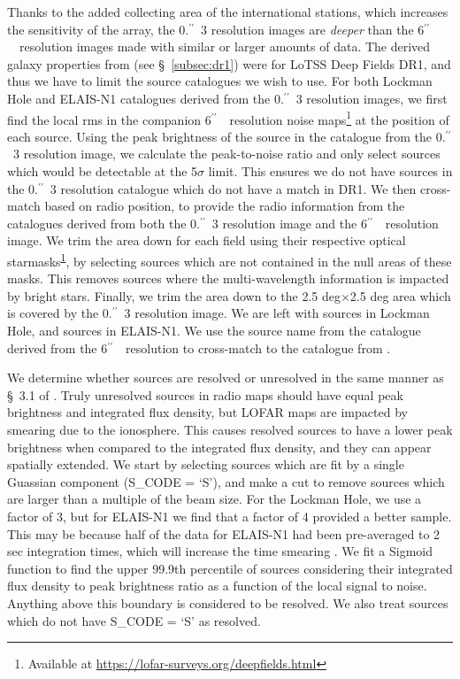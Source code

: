 \documentclass[usenatbib,fleqn,letters]{mnras}
\newcommand{\sarc}{$^{\prime\prime}\!\!$}
\begin{document}
Thanks to the added collecting area of the international stations, which increases the sensitivity of the array, the 0.\sarc\ 3 resolution images are \textit{deeper} than the 6\sarc\ \ resolution images made with similar or larger amounts of data. The derived galaxy properties from  (see \S~\ref{subsec:dr1}) were for LoTSS Deep Fields DR1, and thus we have to limit the source catalogues we wish to use. For both Lockman Hole and ELAIS-N1 catalogues derived from the 0.\sarc\ 3 resolution images, we first find the local rms in the companion 6\sarc\ \ resolution noise maps\footnote{\label{dr1}Available at \href{https://lofar-surveys.org/deepfields.html}{https://lofar-surveys.org/deepfields.html}} at the position of each source. Using the peak brightness of the source in the catalogue from the 0.\sarc\ 3 resolution image, we calculate the peak-to-noise ratio and only select sources which would be detectable at the 5$\sigma$ limit. This ensures we do not have sources in the 0.\sarc\ 3 resolution catalogue which do not have a match in DR1. We then cross-match based on radio position, to provide the radio information from the catalogues derived from both the 0.\sarc\ 3 resolution image and the 6\sarc\ \ resolution image. We trim the area down for each field using their respective optical starmasks\textsuperscript{\ref{dr1}}, by selecting sources which are not contained in the null areas of these masks. This removes sources where the multi-wavelength information is impacted by bright stars. Finally, we trim the area down to the 2.5 deg$\times$2.5 deg area which is covered by the 0.\sarc\ 3 resolution image. We are left with sources in Lockman Hole, and sources in ELAIS-N1. We use the source name from the catalogue derived from the 6\sarc\ \ resolution to cross-match to the catalogue from . 

We determine whether sources are resolved or unresolved in the same manner as \S~3.1 of \cite{shimwell_lofar_2019,shimwell_lofar_2022}. Truly unresolved sources in radio maps should have equal peak brightness and integrated flux density, but LOFAR maps are impacted by smearing due to the ionosphere. This causes resolved sources to have a lower peak brightness when compared to the integrated flux density, and they can appear spatially extended. We start by selecting sources which are fit by a single Guassian component ({\ttfamily S\_CODE = `S'}), and make a cut to remove sources which are larger than a multiple of the beam size. For the Lockman Hole, we use a factor of 3, but for ELAIS-N1 we find that a factor of 4 provided a better sample. This may be because half of the data for ELAIS-N1 had been pre-averaged to 2 sec integration times, which will increase the time smearing \citep[see \S~2 in][]{de_jong_into_2024}. We fit a Sigmoid function to find the upper 99.9th percentile of sources considering their integrated flux density to peak brightness ratio as a function of the local signal to noise. Anything above this boundary is considered to be resolved. We also treat sources which do not have {\ttfamily S\_CODE = `S'} as resolved.
\end{document}
